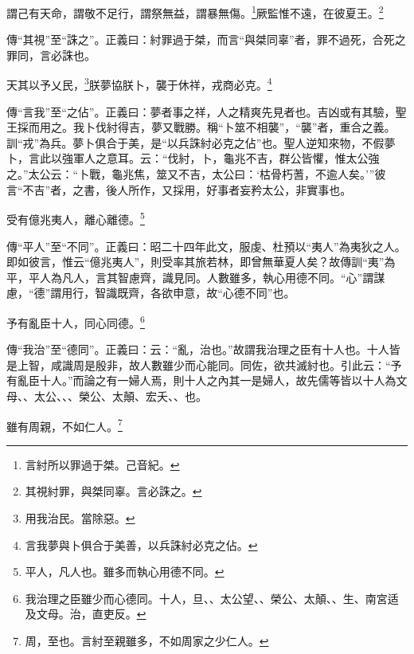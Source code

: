 謂己有天命，謂敬不足行，謂祭無益，謂暴無傷。\footnote{言紂所以罪過于桀。己音紀。}厥監惟不遠，在彼夏王。\footnote{其視紂罪，與桀同辜。言必誅之。}

{\noindent\zhuan{}\fzbyks 傳“其視”至“誅之”。正義曰：紂罪過于桀，而言“與桀同辜”者，罪不過死，合死之罪同，言必誅也。 \par}

天其以予乂民，\footnote{用我治民。當除惡。}朕夢協朕卜，襲于休祥，戎商必克。\footnote{言我夢與卜俱合于美善，以兵誅紂必克之佔。}

{\noindent\zhuan{}\fzbyks 傳“言我”至“之佔”。正義曰：夢者事之祥，人之精爽先見者也。吉凶或有其驗，聖王採而用之。我卜伐紂得吉，夢又戰勝。稱“卜筮不相襲”，“襲”者，重合之義。訓“戎”為兵。夢卜俱合于美，是“以兵誅紂必克之佔”也。聖人逆知來物，不假夢卜，言此以強軍人之意耳。云：“伐紂，卜，龜兆不吉，群公皆懼，惟太公強之。”太公云：“卜戰，龜兆焦，筮又不吉，太公曰：‘枯骨朽蓍，不逾人矣。’”彼言“不吉”者，之書，後人所作，又採用，好事者妄矜太公，非實事也。 \par}

受有億兆夷人，離心離德。\footnote{平人，凡人也。雖多而執心用德不同。}

{\noindent\zhuan{}\fzbyks 傳“平人”至“不同”。正義曰：昭二十四年此文，服虔、杜預以“夷人”為夷狄之人。即如彼言，惟云“億兆夷人”，則受率其旅若林，即曾無華夏人矣？故傳訓“夷”為平，平人為凡人，言其智慮齊，識見同。人數雖多，執心用德不同。“心”謂謀慮，“德”謂用行，智識既齊，各欲申意，故“心德不同”也。 \par}

予有亂臣十人，同心同德。\footnote{我治理之臣雖少而心德同。十人，旦、、太公望、、榮公、太顛、、生、南宮适及文母。治，直吏反。}

{\noindent\zhuan{}\fzbyks 傳“我治”至“德同”。正義曰：云：“亂，治也。”故謂我治理之臣有十人也。十人皆是上智，咸識周是殷非，故人數雖少而心能同。同佐，欲共滅紂也。引此云：“予有亂臣十人。”而論之有一婦人焉，則十人之內其一是婦人，故先儒等皆以十人為文母、、太公、、、榮公、太顛、宏夭、、也。 \par}

雖有周親，不如仁人。\footnote{周，至也。言紂至親雖多，不如周家之少仁人。}

